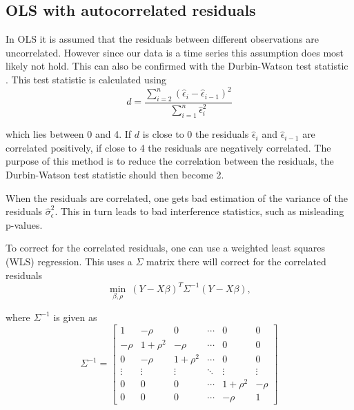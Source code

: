 
\subsection{OLS with autocorrelated residuals}

In OLS it is assumed that the residuals between different observations are uncorrelated. However since our data is a time series this assumption does most likely not hold. This can also be confirmed with the Durbin-Watson test statistic \cite[p.~173]{autocorrelation-kousgaard}. This test statistic is calculated using
\begin{equation}
d = \frac{\sum_{i=2}^n \left( \hat{\epsilon}_i - \hat{\epsilon}_{i-1} \right)^2}{ \sum_{i=1}^n\hat{\epsilon}_i^2 }
\end{equation}

which lies between 0 and 4. If $d$ is close to 0 the residuals $\hat{\epsilon}_i$ and $\hat{\epsilon}_{i-1}$ are correlated positively, if close to 4 the residuals are negatively correlated. The purpose of this method is to reduce the correlation between the residuals, the Durbin-Watson test statistic should then become 2.

When the residuals are correlated, one gets bad estimation of the variance of the residuals $\hat{\sigma}_\epsilon^2$. This in turn leads to bad interference statistics, such as misleading p-values.

To correct for the correlated residuals, one can use a weighted least squares (WLS) regression. This uses a $\Sigma$ matrix there will correct for the correlated residuals
\begin{equation}
\min_{\beta, \rho}\ (Y-X\beta)^T \Sigma^{-1}(Y-X\beta),
\label{eq:theory-olsar-min}
\end{equation}

where $ \Sigma^{-1}$ is given as
\begin{equation}
\Sigma^{-1}  = \begin{bmatrix}
1         & -\rho         & 0               & \cdots & 0              & 0         \\
-\rho   & 1+\rho^2 & -\rho         & \cdots & 0               & 0         \\
0         & -\rho         & 1+\rho^2 & \cdots &0                & 0         \\
\vdots & \vdots      & \vdots       & \ddots & \vdots      & \vdots \\
0         & 0               &0                & \cdots & 1+\rho^2 & -\rho    \\
0         & 0               &0                & \cdots &-\rho          & 1
\end{bmatrix}
\end{equation}

